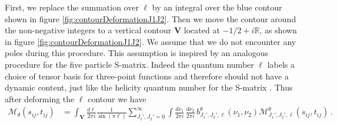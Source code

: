% 
% 
First, we replace the summation over $ \ell $ by an integral over the blue contour shown in figure \ref{fig:contourDeformationJ1J2}.
Then we  move the contour around the non-negative integers to a vertical contour $ \mathbf{V} $ located at $ -1/2+i \mathbb{R} $, as shown in figure \ref{fig:contourDeformationJ1J2}.
We assume that we do not encounter any poles during this procedure.
This assumption is inspired by an analogous procedure for the five particle S-matrix.
Indeed the quantum number $ \ell $ labels a choice of tensor basis for three-point functions and therefore should not
have a dynamic content, just like the
helicity quantum number for the S-matrix  \cite{Abarbanel:1972ayr}.
Thus after deforming the $\ell$ contour we have
\begin{align}
  \mathcal{M}_{\theta} ( s_{ij},t_{ij}) & =
  \int_{\mathbf{V}} \frac{d \ell}{2\pi i} \frac{1}{\sin ( \pi \ell)}
  \sum_{J_1',J_2'=0}^{\infty}
  \int \frac{d \nu_1}{2\pi i}\,
  \frac{d \nu_2}{2\pi i}\, b_{J_1',J_2',\ell}^{\theta}(\nu_1,\nu_2)\mathcal{M}_{J_1',J_2',\ell}^{\theta}(s_{ij},t_{ij})
  \,.
\end{align}

